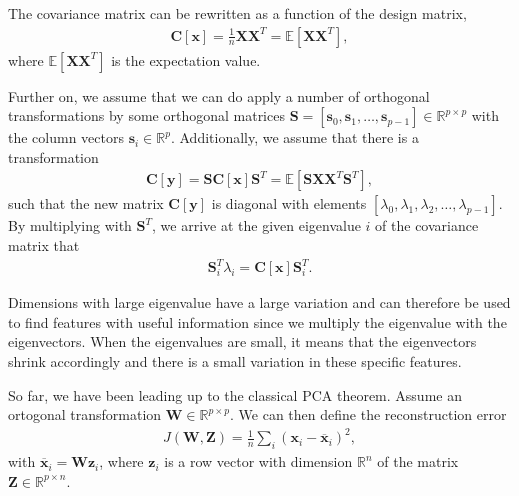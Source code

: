 The covariance matrix can be rewritten as a function of the design matrix,
\begin{align}
  \boldsymbol{C}[\boldsymbol{x}] = \frac{1}{n}\boldsymbol{X}\boldsymbol{X}^T= \mathbb{E}[\boldsymbol{X}\boldsymbol{X}^T],
\end{align}
where $\mathbb{E}[\boldsymbol{X}\boldsymbol{X}^T]$ is the expectation value.

Further on, we assume that we can do apply a number of orthogonal transformations by some orthogonal matrices $\boldsymbol{S}=[\boldsymbol{s}_0,\boldsymbol{s}_1,\dots,\boldsymbol{s}_{p-1}]\in {\mathbb{R}}^{p\times p}$ with the column vectors $\boldsymbol{s}_i \in {\mathbb{R}}^{p}$. Additionally, we assume that there is a transformation
\begin{align}
  \boldsymbol{C}[\boldsymbol{y}] =\boldsymbol{S}\boldsymbol{C}[\boldsymbol{x}]\boldsymbol{S}^T = \mathbb{E}[\boldsymbol{S}\boldsymbol{X}\boldsymbol{X}^T\boldsymbol{S}^T],
\end{align}
such that the new matrix $\boldsymbol{C}[\boldsymbol{y}]$ is diagonal with elements $[\lambda_0,\lambda_1,\lambda_2,\dots,\lambda_{p-1}]$. By multiplying with $\boldsymbol{S}^T$, we arrive at the given eigenvalue $i$ of the covariance matrix that
\begin{align}
  \boldsymbol{S}^T_i\lambda_i = \boldsymbol{C}[\boldsymbol{x}]\boldsymbol{S}^T_i.
\end{align}

Dimensions with large eigenvalue have a large variation and can therefore be used to find features with useful information since we multiply the eigenvalue with the eigenvectors. When the eigenvalues are small, it means that the eigenvectors shrink accordingly and there is a small variation in these specific features.

So far, we have been leading up to the classical PCA theorem. Assume an ortogonal transformation $\boldsymbol{W}\in {\mathbb{R}}^{p\times p}$. We can then define the reconstruction error
\begin{align}
  J(\boldsymbol{W},\boldsymbol{Z}) = \frac{1}{n}\sum_i (\boldsymbol{x}_i - \overline{\boldsymbol{x}}_i)^2,
\end{align}
with $\overline{\boldsymbol{x}}_i = \boldsymbol{W}\boldsymbol{z}_i$, where $\boldsymbol{z}_i$ is a row vector with dimension ${\mathbb{R}}^{n}$ of the matrix
$\boldsymbol{Z}\in{\mathbb{R}}^{p\times n}$.

